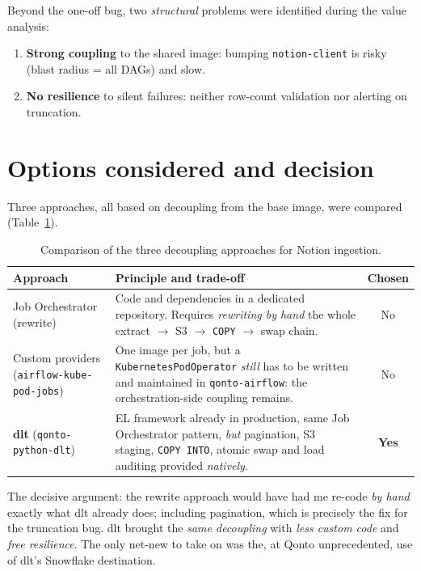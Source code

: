Beyond the one-off bug, two \emph{structural} problems were identified during the value analysis:

\begin{enumerate}
  \item \textbf{Strong coupling} to the shared image: bumping \texttt{notion-client} is risky (blast radius = all DAGs) and slow.
  \item \textbf{No resilience} to silent failures: neither row-count validation nor alerting on truncation.
\end{enumerate}

\section{Options considered and decision}

Three approaches, all based on decoupling from the base image, were compared (Table~\ref{tab:notion-options}).

\begin{table}[H]
\centering\small
\renewcommand{\arraystretch}{1.3}
\begin{tabularx}{\textwidth}{@{}p{3.1cm}Xc@{}}
\toprule
\textbf{Approach} & \textbf{Principle and trade-off} & \textbf{Chosen} \\
\midrule
Job Orchestrator (rewrite) & Code and dependencies in a dedicated repository. Requires \emph{rewriting by hand} the whole extract $\rightarrow$ S3 $\rightarrow$ \texttt{COPY} $\rightarrow$ swap chain. & No \\
Custom providers (\texttt{airflow-kube-pod-jobs}) & One image per job, but a \texttt{KubernetesPodOperator} \emph{still} has to be written and maintained in \texttt{qonto-airflow}: the orchestration-side coupling remains. & No \\
\textbf{dlt} (\texttt{qonto-python-dlt}) & EL framework already in production, same Job Orchestrator pattern, \emph{but} pagination, S3 staging, \texttt{COPY INTO}, atomic swap and load auditing provided \emph{natively}. & \textbf{Yes} \\
\bottomrule
\end{tabularx}
\caption{Comparison of the three decoupling approaches for Notion ingestion.}
\label{tab:notion-options}
\end{table}

The decisive argument: the rewrite approach would have had me re-code \emph{by hand} exactly what dlt already does; including pagination, which is precisely the fix for the truncation bug. dlt brought the \emph{same decoupling} with \emph{less custom code} and \emph{free resilience}. The only net-new to take on was the, at Qonto unprecedented, use of dlt's Snowflake destination.

